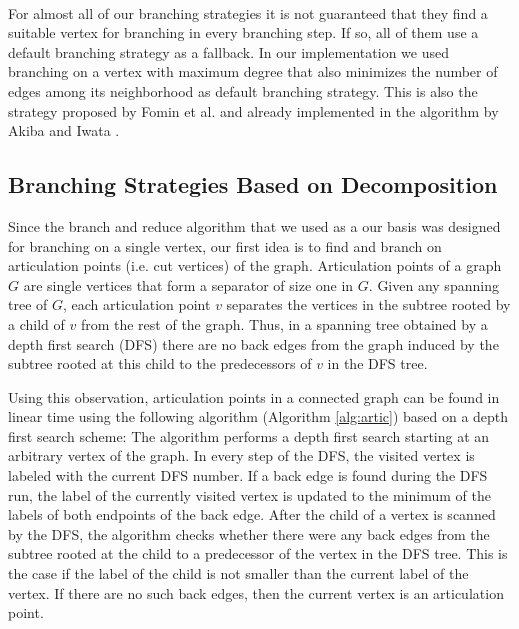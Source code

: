 \documentclass[]{article}
\begin{document}
\paragraph{}

\paragraph{}
For almost all of our branching strategies it is not guaranteed that they find a suitable vertex for branching in every branching step. If so, all of them use a default branching strategy as a fallback. In our implementation we used branching on a vertex with maximum degree that also minimizes the number of edges among its neighborhood  as default branching strategy. This is also the strategy proposed by Fomin et al. \cite{Fomin} and already implemented in the algorithm by Akiba and Iwata \cite{AkibaIwata}.

\subsection{Branching Strategies Based on Decomposition} \label{decomp}
Since the branch and reduce algorithm that we used as a our basis was designed for branching on a single vertex, our first idea is to find and branch on articulation points  (i.e. cut vertices) of the graph. Articulation points of a graph $G$ are single vertices that form a separator of size one in $G$. Given any spanning tree of $G$, each articulation point $v$ separates the vertices in the subtree rooted by a child of $v$ from the rest of the graph. Thus, in a spanning tree obtained by a depth first search (DFS) there are no back edges from the graph induced by the subtree rooted at this child to the predecessors of $v$ in the DFS tree.

Using this observation, articulation points in a connected graph can be found in linear time using the following algorithm (Algorithm \ref{alg:artic}) based on a depth first search scheme: The algorithm performs a depth first search starting at an arbitrary vertex of the graph. In every step of the DFS, the visited vertex is labeled with the current DFS number. If a back edge is found during the DFS run, the label of the currently visited vertex is updated to the minimum of the labels of both endpoints of the back edge. After the child of a vertex is scanned by the DFS, the algorithm checks whether there were any back edges from the subtree rooted at the child to a predecessor of the vertex in the DFS tree. This is the case if the label of the child is not smaller than the current label of the vertex. If there are no such back edges, then the current vertex is an articulation point.
\end{document}
